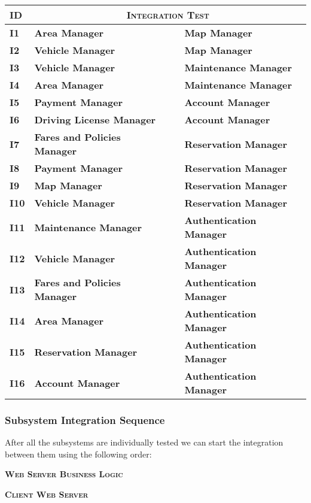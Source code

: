 \begin{longtable}{ |l|lcl| }
	\hline
	\textbf{ID} & \multicolumn{3}{c|}{\textbf{\textsc{Integration Test}}} \\
  \hline
	\textbf{I1} & \textbf{Area Manager} & \textbf{\textrightarrow{}} & \textbf{Map Manager} \\
  \hline
  \textbf{I2} & \textbf{Vehicle Manager} & \textbf{\textrightarrow{}} & \textbf{Map Manager} \\
	\hline
  \textbf{I3} & \textbf{Vehicle Manager} & \textbf{\textrightarrow{}} & \textbf{Maintenance Manager} \\
  \hline
  \textbf{I4} & \textbf{Area Manager} & \textbf{\textrightarrow{}} & \textbf{Maintenance Manager} \\
  \hline
  \textbf{I5} & \textbf{Payment Manager} & \textbf{\textrightarrow{}} & \textbf{Account Manager} \\
  \hline
  \textbf{I6} & \textbf{Driving License Manager} & \textbf{\textrightarrow{}} & \textbf{Account Manager} \\
  \hline
  \textbf{I7} & \textbf{Fares and Policies Manager} & \textbf{\textrightarrow{}} & \textbf{Reservation Manager} \\
	\hline
  \textbf{I8} & \textbf{Payment Manager} & \textbf{\textrightarrow{}} & \textbf{Reservation Manager} \\
	\hline
	\textbf{I9} & \textbf{Map Manager} & \textbf{\textrightarrow{}} & \textbf{Reservation Manager} \\
	\hline
  \textbf{I10} & \textbf{Vehicle Manager} & \textbf{\textrightarrow{}} & \textbf{Reservation Manager} \\
	\hline
  \textbf{I11} & \textbf{Maintenance Manager} & \textbf{\textrightarrow{}} & \textbf{Authentication Manager} \\
	\hline
  \textbf{I12} & \textbf{Vehicle Manager} & \textbf{\textrightarrow{}} & \textbf{Authentication Manager} \\
	\hline
  \textbf{I13} & \textbf{Fares and Policies Manager} & \textbf{\textrightarrow{}} & \textbf{Authentication Manager} \\
	\hline
  \textbf{I14} & \textbf{Area Manager} & \textbf{\textrightarrow{}} & \textbf{Authentication Manager} \\
	\hline
  \textbf{I15} & \textbf{Reservation Manager} & \textbf{\textrightarrow{}} & \textbf{Authentication Manager} \\
	\hline
  \textbf{I16} & \textbf{Account Manager} & \textbf{\textrightarrow{}} & \textbf{Authentication Manager} \\
	\hline

\end{longtable}


\subsubsection{Subsystem Integration Sequence}

After all the subsystems are individually tested we can start the integration
between them using the following order: \newline

\centerline{\textsc{\textbf{Web Server \textrightarrow{} Business Logic}}}
\centerline{\textsc{\textbf{Client \textrightarrow{} Web Server}}}
